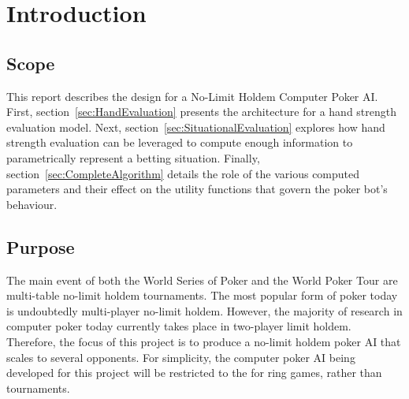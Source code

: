 


\chapter{Introduction}
\label{sec:Intro}

\section{Scope}
\label{sec:Scope}

This report describes the design for a No-Limit Holdem Computer Poker AI.
First, section~\ref{sec:HandEvaluation} presents the architecture for a hand strength evaluation model.
Next, section~\ref{sec:SituationalEvaluation} explores how hand strength evaluation can be leveraged to compute enough information to parametrically represent a betting situation.
Finally, section~\ref{sec:CompleteAlgorithm} details the role of the various computed parameters and their effect on the utility functions that govern the poker bot's behaviour.

\section{Purpose}
\label{sec:Purpose}

The main event of both the World Series of Poker and the World Poker Tour are multi-table no-limit holdem tournaments.
The most popular form of poker today is undoubtedly multi-player no-limit holdem.
However, the majority of research in computer poker today currently takes place in two-player limit holdem.
Therefore, the focus of this project is to produce a no-limit holdem poker AI that scales to several opponents.
For simplicity, the computer poker AI being developed for this project will be restricted to the for ring games, rather than tournaments.



 
